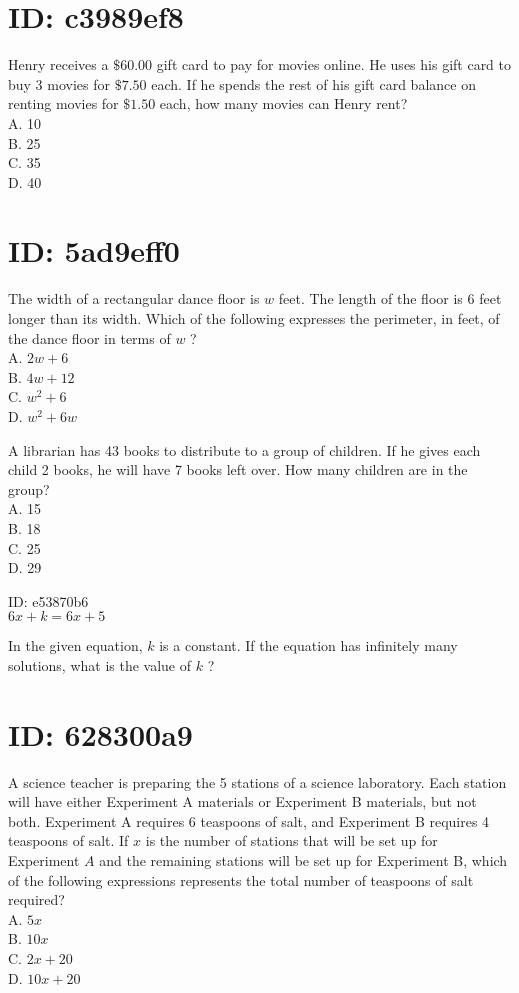 \section*{ID: c3989ef8}
Henry receives a $\$ 60.00$ gift card to pay for movies online. He uses his gift card to buy 3 movies for $\$ 7.50$ each. If he spends the rest of his gift card balance on renting movies for $\$ 1.50$ each, how many movies can Henry rent?\\
A. 10\\
B. 25\\
C. 35\\
D. 40

\section*{ID: 5ad9eff0}
The width of a rectangular dance floor is $w$ feet. The length of the floor is 6 feet longer than its width. Which of the following expresses the perimeter, in feet, of the dance floor in terms of $w$ ?\\
A. $2 w+6$\\
B. $4 w+12$\\
C. $w^{2}+6$\\
D. $w^{2}+6 w$

A librarian has 43 books to distribute to a group of children. If he gives each child 2 books, he will have 7 books left over. How many children are in the group?\\
A. 15\\
B. 18\\
C. 25\\
D. 29

ID: e53870b6\\
$6 x+k=6 x+5$

In the given equation, $k$ is a constant. If the equation has infinitely many solutions, what is the value of $k$ ?

\section*{ID: 628300a9}
A science teacher is preparing the 5 stations of a science laboratory. Each station will have either Experiment A materials or Experiment B materials, but not both. Experiment A requires 6 teaspoons of salt, and Experiment B requires 4 teaspoons of salt. If $x$ is the number of stations that will be set up for Experiment $A$ and the remaining stations will be set up for Experiment B, which of the following expressions represents the total number of teaspoons of salt required?\\
A. $5 x$\\
B. $10 x$\\
C. $2 x+20$\\
D. $10 x+20$

